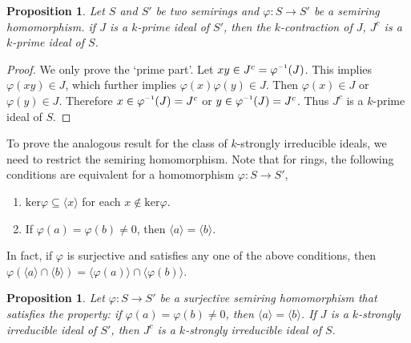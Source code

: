 \documentclass[11pt,english]{amsart}
\newcommand{\inv}{^{\raisebox{.2ex}{$\scriptscriptstyle-1$}}}
\newtheorem{proposition}[theorem]{Proposition}
\theoremstyle{definition}
\numberwithin{equation}{section}
\begin{document}
\begin{proposition}
    Let $S$ and $S'$ be two semirings and $\varphi\colon S\to S'$ be a semiring homomorphism. if $J$ is a $k$-prime ideal of $S'$, then the $k$-contraction of $J$, $J^c$ is a $k$-prime ideal of $S$. 
\end{proposition}

\begin{proof}
    
    We only prove the `prime part'. Let $xy\in J^c=\varphi\inv(J)$. This implies $\varphi(xy)\in J$, which further implies $\varphi(x)\varphi(y)\in J$. Then $\varphi(x)\in J$ or $\varphi(y)\in J$. Therefore $x\in \varphi\inv(J)=J^c$ or $y\in \varphi\inv(J)=J^c$. Thus $J^c$ is a $k$-prime ideal of $S$. 
\end{proof}

To prove the analogous result for the class of $k$-strongly irreducible ideals, we need to restrict the semiring homomorphism. Note that for rings, the following conditions are equivalent for a homomorphism $\varphi\colon S\to S'$,
\begin{enumerate}
    \item $\mathrm{ker}\varphi\subseteq \langle x \rangle $ for each $x\notin \mathrm{ker}\varphi$.
    
    \item If $\varphi(a)=\varphi(b) \neq 0$, then $\langle a \rangle =\langle b \rangle$.
\end{enumerate}
In fact, if $\varphi$ is surjective and satisfies any one of the above conditions, then $\varphi( \langle a \rangle \cap \langle b \rangle)= \langle \varphi(a) \rangle \cap \langle \varphi (b) \rangle $.

\begin{proposition}\label{Stableness of k-strongly irreducible ideals}
Let $\varphi\colon S\to S'$ be a surjective semiring homomorphism that satisfies the property: if $\varphi(a)=\varphi(b) \neq 0$, then $\langle a \rangle =\langle b \rangle$. If $J$ is a $k$-strongly irreducible ideal of $S'$, then $J^c$ is a
$k$-strongly irreducible ideal of $S$.
\end{proposition}
\end{document}
